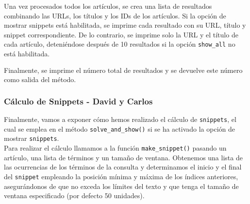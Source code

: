 \documentclass[12pt,a4paper]{article}
\begin{document}
Una vez procesados todos los artículos, se crea una lista de resultados combinando las URLs, los títulos y los IDs de los artículos. Si la opción de mostrar snippets está habilitada, se imprime cada resultado con su URL, título y snippet correspondiente. De lo contrario, se imprime solo la URL y el título de cada artículo, deteniéndose después de 10 resultados si la opción \texttt{show\_all} no está habilitada.

Finalmente, se imprime el número total de resultados y se devuelve este número como salida del método.

\subsubsection{Cálculo de Snippets - David y Carlos}
Finalmente, vamos a exponer cómo hemos realizado el cálculo de \texttt{snippets}, el cual se emplea en el método \texttt{solve\_and\_show()} si se ha activado la opción de mostrar \texttt{snippets}.\\
Para realizar el cálculo llamamos a la función \texttt{make\_snippet()} pasando un artículo, una lista de términos y un tamaño de ventana. Obtenemos una lista de las ocurrencias de los términos de la consulta y determinamos el inicio y el final del \texttt{snippet} empleando la posición mínima y máxima de los índices anteriores, asegurándonos de que no exceda los límites del texto y que tenga el tamaño de ventana especificado (por defecto 50 unidades).
\end{document}
